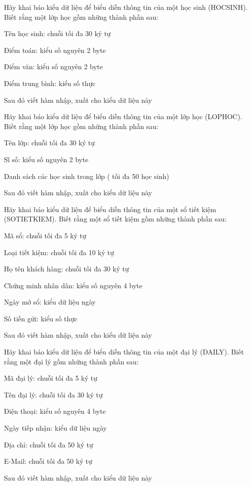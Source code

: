 \begin{problem}
    Hãy khai báo kiểu dữ liệu để biểu diễn thông tin của một học sinh (HOCSINH). Biết rằng một lớp học gồm những thành phần sau:

Tên học sinh: chuỗi tối đa 30 ký tự

Điểm toán: kiểu số nguyên 2 byte

Điểm văn: kiểu số nguyên 2 byte

Điểm trung bình: kiểu số thực

Sau đó viết hàm nhập, xuất cho kiểu dữ liệu này
\end{problem}
\begin{problem}
    Hãy khai báo kiểu dữ liệu để biểu diễn thông tin của một lớp học (LOPHOC). Biết rằng một lớp học gồm những thành phần sau:

Tên lớp: chuỗi tối đa 30 ký tự

Sĩ số: kiểu số nguyên 2 byte

Danh sách các học sinh trong lớp ( tối đa 50 học sinh)

Sau đó viết hàm nhập, xuất cho kiểu dữ liệu này
\end{problem}
\begin{problem}
    Hãy khai báo kiểu dữ liệu để biểu diễn thông tin của một sổ tiết kiệm (SOTIETKIEM). Biết rằng một sổ tiết kiệm gồm những thành phần sau:

Mã sổ: chuỗi tối đa 5 ký tự

Loại tiết kiệm: chuỗi tối đa 10 ký tự

Họ tên khách hàng: chuỗi tối đa 30 ký tự

Chứng minh nhân dân: kiểu số nguyên 4 byte

Ngày mở sổ: kiểu dữ liệu ngày

Số tiền gửi: kiểu số thực

Sau đó viết hàm nhập, xuất cho kiểu dữ liệu này
\end{problem}
\begin{problem}
    Hãy khai báo kiểu dữ liệu để biểu diễn thông tin của một đại lý (DAILY). Biết rằng một đại lý gồm những thành phần sau:

Mã đại lý: chuỗi tối đa 5 ký tự

Tên đại lý: chuỗi tối đa 30 ký tự

Điện thoại: kiểu số nguyên 4 byte

Ngày tiếp nhận: kiểu dữ liệu ngày

Địa chỉ: chuỗi tối đa 50 ký tự

E-Mail: chuỗi tối đa 50 ký tự

Sau đó viết hàm nhập, xuất cho kiểu dữ liệu này
\end{problem}

